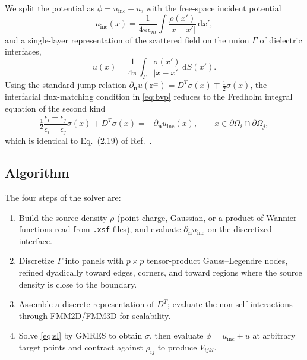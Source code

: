 \documentclass[prb,preprintnumbers,amsmath,amssymb, 10pt]{revtex4}
\newcommand{\V}[1]{\boldsymbol{#1}}
\newcommand{\abs}[1]{\left|#1\right|}
\begin{document}
We split the potential as $\phi = u_{\text{inc}} + u$, with the free-space
incident potential
\begin{equation}
    u_{\text{inc}}(x) = \frac{1}{4\pi\epsilon_m}
        \int \frac{\rho(x')}{\abs{x-x'}}\, \mathrm{d}x',
\end{equation}
and a single-layer representation of the scattered field on the union
$\Gamma$ of dielectric interfaces,
\begin{equation}
    u(x) = \frac{1}{4\pi}\int_\Gamma \frac{\sigma(x')}{\abs{x-x'}}\, \mathrm{d}S(x').
\end{equation}
Using the standard jump relation $\partial_{\V n} u(\V r^{\pm}) = D^T\sigma(x)
\mp \tfrac{1}{2}\sigma(x)$, the interfacial flux-matching condition in
\eqref{eq:bvp} reduces to the Fredholm integral equation of the second
kind~\cite{greengard1994numerical}
\begin{equation}\label{eq:sl}
    \tfrac{1}{2}\frac{\epsilon_i+\epsilon_j}{\epsilon_i-\epsilon_j}\sigma(x)
        + D^T \sigma(x) = -\partial_{\V n} u_{\text{inc}}(x),
        \qquad x \in \partial\Omega_i \cap \partial\Omega_j,
\end{equation}
which is identical to Eq.~(2.19) of Ref.~\cite{greengard1994numerical}.

\subsection{Algorithm}

The four steps of the solver are:
\begin{enumerate}
  \item[1.] Build the source density $\rho$ (point charge, Gaussian, or a
      product of Wannier functions read from \texttt{.xsf} files), and
      evaluate $\partial_{\V n} u_{\text{inc}}$ on the discretized
      interface.
  \item[2.] Discretize $\Gamma$ into panels with $p\times p$ tensor-product
      Gauss--Legendre nodes, refined dyadically toward edges, corners, and
      toward regions where the source density is close to the boundary.
  \item[3.] Assemble a discrete representation of $D^T$; evaluate the
      non-self interactions through FMM2D/FMM3D for scalability.
  \item[4.] Solve \eqref{eq:sl} by GMRES to obtain $\sigma$, then evaluate
      $\phi = u_{\text{inc}} + u$ at arbitrary target points and contract
      against $\rho_{ij}$ to produce $V_{ijkl}$.
\end{enumerate}
\end{document}
